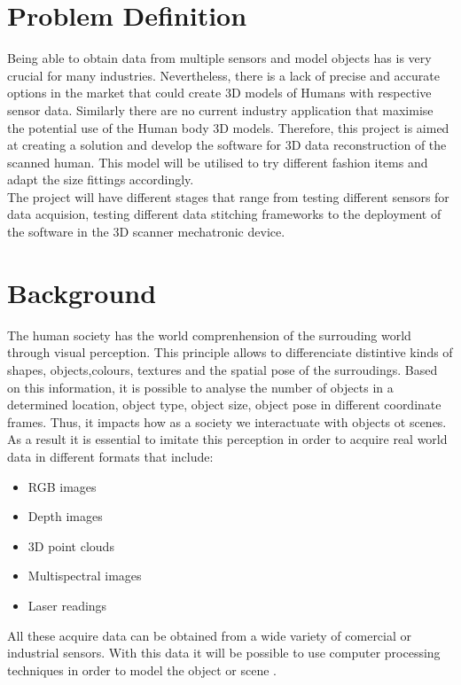 \documentclass[12pt]{report}
\begin{document}
\section{Problem Definition}
Being able to obtain data from multiple sensors and model objects has is very crucial for many industries.
Nevertheless, there is a lack of precise and accurate options in the market that could create 3D models of Humans with respective sensor data. Similarly there are no current industry application that maximise the potential use of the Human body 3D models.
Therefore, this project is aimed at creating a solution and develop the software for 3D data reconstruction of the scanned human. This model will be utilised to try different fashion items and adapt the size fittings accordingly. \\[10pt]
The project will have different stages that range from testing different sensors for data acquision, testing different data stitching frameworks to the deployment of the software in the 3D scanner mechatronic device. 
\enlargethispage{\baselineskip}

\section{Background}
The human society has the world comprenhension of the surrouding world through visual perception. This principle allows to differenciate distintive kinds of shapes, objects,colours, textures and the spatial pose of the surroudings.
Based on this information, it is possible to analyse the number of objects in a determined location, object type, object size, object pose in different coordinate frames. 
Thus, it impacts how as a society we interactuate with objects ot scenes. As a result it is essential to imitate this perception in order to acquire real world data in different formats that include:
\begin{itemize}[]
    \item RGB images
     \item Depth images
     \item 3D point clouds 
     \item Multispectral images
     \item Laser readings
\end{itemize}
All these acquire data can be obtained from a wide variety of comercial or industrial sensors. With this data it will be possible to use computer processing techniques in order to model the object or scene \citep*{murcia_monroy_mora_2018}.
\end{document}
